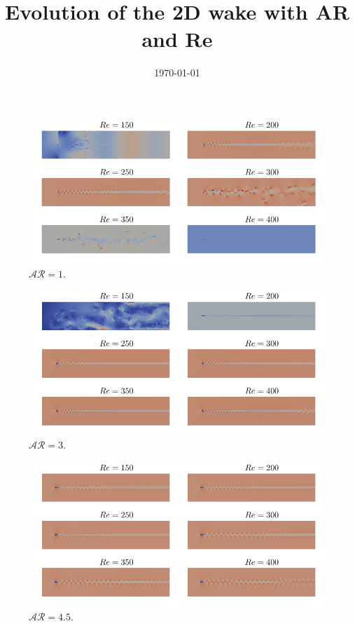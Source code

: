 \documentclass[onecolumn,notitlepage,superscriptaddress, amsmath,amssymb,longbibliographyaps,floatfix]{revtex4-1}
\begin{document}
\title{Evolution of the 2D wake with AR and Re}
\author{}
\date{\today}
\maketitle



\begin{figure}
  \centering
  \includegraphics[width=\textwidth]{./fig/AR1.pdf}
  \caption{$\mathcal{AR}=1$.}
  \label{fig:AR1}
\end{figure}

\begin{figure}
  \centering
  \includegraphics[width=\textwidth]{./fig/AR3.pdf}
  \caption{$\mathcal{AR}=3$.}
  \label{fig:AR3}
\end{figure}

\begin{figure}
  \centering
  \includegraphics[width=\textwidth]{./fig/AR4p5.pdf}
  \caption{$\mathcal{AR}=4.5$.}
  \label{fig:AR4p5}
\end{figure}
\end{document}
